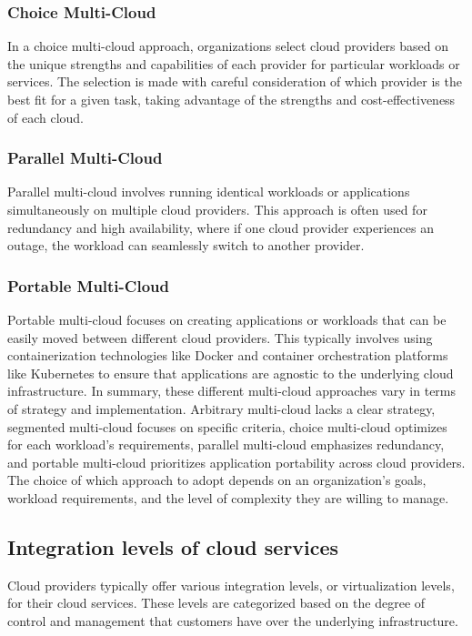 \subsubsection{Choice Multi-Cloud}
In a choice multi-cloud approach, organizations select cloud providers based on the unique strengths and capabilities of each provider for particular workloads or services.
The selection is made with careful consideration of which provider is the best fit for a given task, taking advantage of the strengths and cost-effectiveness of each cloud.

\subsubsection{Parallel Multi-Cloud}
Parallel multi-cloud involves running identical workloads or applications simultaneously on multiple cloud providers.
This approach is often used for redundancy and high availability, where if one cloud provider experiences an outage, the workload can seamlessly switch to another provider.

\subsubsection{Portable Multi-Cloud}
Portable multi-cloud focuses on creating applications or workloads that can be easily moved between different cloud providers.
This typically involves using containerization technologies like Docker and container orchestration platforms like Kubernetes to ensure that applications are agnostic to the underlying cloud infrastructure.
In summary, these different multi-cloud approaches vary in terms of strategy and implementation. Arbitrary multi-cloud lacks a clear strategy, segmented multi-cloud focuses on specific criteria, choice multi-cloud optimizes for each workload's requirements, parallel multi-cloud emphasizes redundancy, and portable multi-cloud prioritizes application portability across cloud providers. The choice of which approach to adopt depends on an organization's goals, workload requirements, and the level of complexity they are willing to manage.


\subsection{Integration levels of cloud services}

Cloud providers typically offer various integration levels, or virtualization levels, for their cloud services. 
These levels are categorized based on the degree of control and management that customers have over the underlying infrastructure. 

